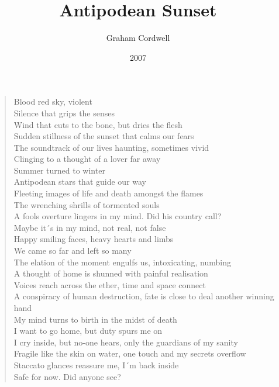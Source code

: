 \documentclass{article}
\title{Antipodean Sunset}
\author{Graham Cordwell}
\date{2007}
\begin{document}
\maketitle

\begin{verse}

Blood red sky, violent \\
Silence that grips the senses \\ 
Wind that cuts to the bone, but dries the flesh \\ 
Sudden stillness of the sunset that calms our fears \\ 

The soundtrack of our lives haunting, sometimes vivid \\ 
Clinging to a thought of a lover far away \\ 
Summer turned to winter \\ 
Antipodean stars that guide our way \\ 

Fleeting images of life and death amongst the flames \\ 
The wrenching shrills of tormented souls \\ 
A fools overture lingers in my mind. Did his country call? \\  
Maybe it´s in my mind, not real, not false \\ 

Happy smiling faces, heavy hearts and limbs \\ 
We came so far and left so many \\ 
The elation of the moment engulfs us, intoxicating, numbing \\ 
A thought of home is shunned with painful realisation \\ 

Voices reach across the ether, time and space connect \\ 
A conspiracy of human destruction, fate is close to deal another winning hand \\ 
My mind turns to birth in the midst of death \\ 
I want to go home, but duty spurs me on \\ 

I cry inside, but no-one hears, only the guardians of my sanity \\  
Fragile like the skin on water, one touch and my secrets overflow \\ 
Staccato glances reassure me, I´m back inside \\ 
Safe for now. Did anyone see? \\ 
  
\end{verse}
  
\end{document}
